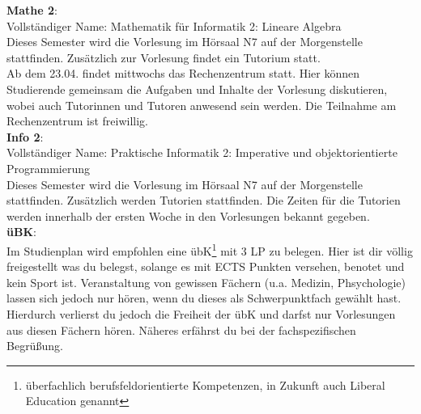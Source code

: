 \textbf{Mathe 2}:\\
Vollständiger Name: Mathematik für Informatik 2: Lineare Algebra\\
Dieses Semester wird die Vorlesung im Hörsaal N7 auf der Morgenstelle stattfinden.
Zusätzlich zur Vorlesung findet ein Tutorium statt. \\
Ab dem 23.04. findet mittwochs das Rechenzentrum statt. Hier können Studierende gemeinsam die Aufgaben und Inhalte der Vorlesung diskutieren,
wobei auch Tutorinnen und Tutoren anwesend sein werden. Die Teilnahme am Rechenzentrum ist freiwillig.\\

\textbf{Info 2}:\\
Vollständiger Name: Praktische Informatik 2: Imperative und objektorientierte Programmierung\\
Dieses Semester wird die Vorlesung im Hörsaal N7 auf der Morgenstelle stattfinden.
Zusätzlich werden Tutorien stattfinden.
Die Zeiten für die Tutorien werden innerhalb der ersten Woche in den Vorlesungen bekannt gegeben.\\

\textbf{üBK}:\\
Im Studienplan wird empfohlen eine übK\footnote{überfachlich berufsfeldorientierte Kompetenzen, in Zukunft auch Liberal Education genannt}
mit 3 LP zu belegen. Hier ist dir völlig freigestellt was du belegst, solange es mit ECTS Punkten versehen, benotet und kein Sport ist.
Veranstaltung von gewissen Fächern (u.a. Medizin, Phsychologie) lassen sich jedoch nur hören, wenn du dieses als Schwerpunktfach gewählt hast.
Hierdurch verlierst du jedoch die Freiheit der übK und darfst nur Vorlesungen aus diesen Fächern hören. Näheres erfährst du bei der fachspezifischen Begrüßung.

\pagebreak
